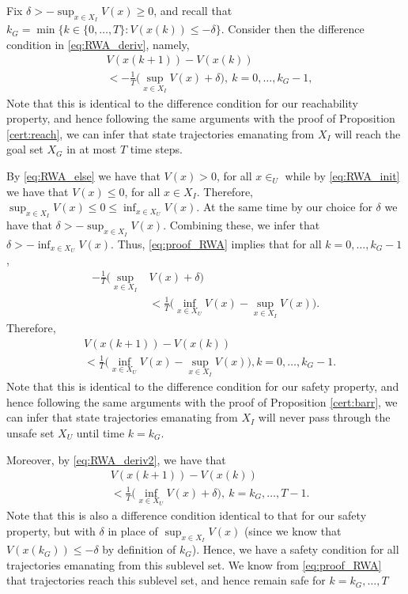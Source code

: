 Fix $\delta > -\sup_{x \in X_I} V(x) \geq 0 $, and recall that $k_G = \min \{k \in \{0,\dots,T\} \colon V(x(k)) \leq -\delta\}$.
Consider then the difference condition in \eqref{eq:RWA_deriv}, namely,
    \begin{equation} \label{eq:proof_RWA}
     \begin{aligned}
        &V(x(k+1))-V(x(k)) \\ &<-\frac{1}{T} \Big ( \sup_{x \in X_I}V(x)+\delta \Big ),~ k=0,\dots,k_G-1,
     \end{aligned}
     \end{equation}
    Note that this is identical to the difference condition for our reachability property, and hence following the same arguments with the proof of Proposition \ref{cert:reach}, we can infer that state trajectories emanating from $X_I$ will reach the goal set $X_G$ in at most $T$ time steps.
    
    By \eqref{eq:RWA_else} we have that $V(x) > 0$, for all $x \in _U$ while by \eqref{eq:RWA_init} we have that $V(x) \leq 0$, for all $x \in X_I$. Therefore, $\sup_{x\in X_I} V(x) \leq 0 \leq \inf_{x \in X_U} V(x)$. At the same time by our choice for $\delta$ we have that $\delta>-\sup_{x \in X_I}V(x)$. Combining these, we infer that $\delta >-\inf_{x \in X_U} V(x)$.
    Thus, \eqref{eq:proof_RWA} implies that for all $k=0,\ldots,k_G-1$,
    \begin{align}
        -\frac{1}{T} \Big ( \sup_{x \in X_I}&V(x) +\delta \Big )  \nonumber \\
        &< \frac{1}{T} \Big (\inf_{x \in X_U}V(x)-\sup_{x \in X_I}V(x)\Big ).
    \end{align}
    Therefore,
     \begin{align}
        &V(x(k+1))-V(x(k)) \\ &<\frac{1}{T} \Big (\inf_{x \in X_U}V(x)-\sup_{x \in X_I}V(x)\Big ), k=0,\dots,k_G-1. \nonumber
     \end{align}
     Note that this is identical to the difference condition for our safety property, and hence following the same arguments with the proof of Proposition \ref{cert:barr}, we can infer that state trajectories emanating from $X_I$ will never pass through the unsafe set $X_U$ until time $k=k_G$.

     Moreover, by \eqref{eq:RWA_deriv2}, we have that 
      \begin{equation}
     \begin{aligned}
        &V(x(k+1))-V(x(k)) \\ &<\frac{1}{T} \Big (\inf_{x \in X_U}V(x)+\delta\Big ),~ k=k_G,\dots,T-1.
     \end{aligned}
     \end{equation}
     Note that this is also a difference condition identical to that for our safety property, but with $\delta$ in place of $\sup_{x \in X_I} V(x)$ (since we know that $V(x(k_G)) \leq -\delta$ by definition of $k_G$).
     Hence, we have a safety condition for all trajectories emanating from this sublevel set.
     We know from \eqref{eq:proof_RWA} that trajectories reach this sublevel set, and hence remain safe for $k=k_G,\ldots,T$

